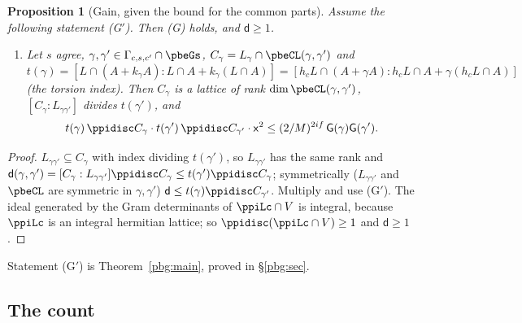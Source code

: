 \documentclass[10pt]{amsart}
\newtheorem{proposition}[theorem]{Proposition}
\theoremstyle{definition}
\theoremstyle{remark}
\begin{document}
\begin{proposition}[Gain, given the bound for the common parts]\label{ppi:G}
Assume the following statement \textup{(G$'$)}. Then \textup{(G)} holds, and $\mathsf d\ge1$.
\begin{enumerate}
\item[(G$'$)] Let $s$ agree, $\gamma,\gamma'\in\Gamma_{c,s,c'}\cap\pbeGs$, $C_\gamma=L_\gamma\cap
\pbeCL(\gamma,\gamma')$ and $t(\gamma)=[L\cap(A+k_\gamma A):L\cap A+k_\gamma(L\cap A)]=[h_cL\cap(A+\gamma A):h_cL\cap A+\gamma(h_cL\cap A)]$ (the
torsion index). Then $C_\gamma$ is a lattice of rank $\dim\pbeCL(\gamma,\gamma')$, $[C_\gamma:L_{\gamma
\gamma'}]$ divides $t(\gamma')$, and
\[
t(\gamma)\,\ppidisc C_\gamma\cdot t(\gamma')\,\ppidisc C_{\gamma'}\cdot\mathsf x^2\le(2/M)^{2if}\,
\mathsf G(\gamma)\mathsf G(\gamma').
\]
\end{enumerate}
\end{proposition}
\begin{proof}
$L_{\gamma\gamma'}\subseteq C_\gamma$ with index dividing $t(\gamma')$, so $L_{\gamma\gamma'}$ has the
same rank and $\mathsf d(\gamma,\gamma')=[C_\gamma:L_{\gamma\gamma'}]\ppidisc C_\gamma\le t(\gamma')
\ppidisc C_\gamma$; symmetrically ($L_{\gamma\gamma'}$ and $\pbeCL$ are symmetric in $\gamma,\gamma'$)
$\mathsf d\le t(\gamma)\ppidisc C_{\gamma'}$. Multiply and use (G$'$). The ideal generated by the
Gram determinants of $\ppiLc\cap V$ is integral, because $\ppiLc$ is an integral hermitian lattice;
so $\ppidisc(\ppiLc\cap V)\ge1$ and $\mathsf d\ge1$.
\end{proof}

Statement (G$'$) is Theorem~\ref{pbg:main}, proved in \S\ref{pbg:sec}.

\subsection{The count}\label{ppi:ss-count}
\end{document}
